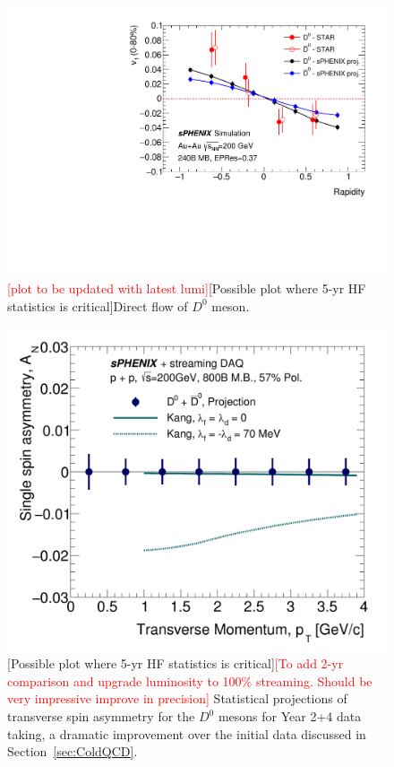 \begin{figure}[h]
\begin{center}
\includegraphics[width=.49\linewidth]{figs/v1_proj_240B_1.pdf}
\caption{ {\textcolor{red}{[plot to be updated with latest lumi]}}[Possible plot where  5-yr HF statistics is critical]Direct flow of $D^0$ meson.}
\label{fig:v1-D0}
\end{center}
\end{figure}
 


\begin{figure}[h]
\begin{center}
\includegraphics[width=.49\linewidth]{figs/RAA_DB_theory_root_AN_D0D0bar.pdf}
\caption{[Possible plot where  5-yr HF statistics is critical]{\textcolor{red}{[To add 2-yr comparison and upgrade luminosity to 100\% streaming. Should be very impressive improve in precision]}} Statistical projections of
  transverse spin asymmetry for the $D^0$ mesons for Year
  2+4 data taking, a dramatic improvement over the initial data discussed in Section~\ref{sec:ColdQCD}. }
\label{fig:AN-D0}
\end{center}
\end{figure}




